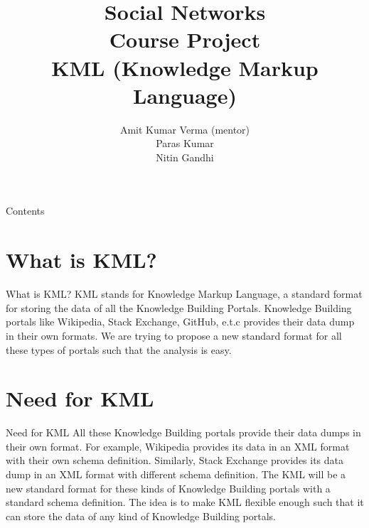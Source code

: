 \documentclass[handout,t]{beamer}
\title[Indian Institute of Technology Ropar]{Social Networks\\Course Project\\KML (Knowledge Markup Language)}
\date{}
\author[KML (Knowledge Markup Language)]{Amit Kumar Verma (mentor)\\ Paras Kumar\\ Nitin Gandhi\\}
\begin{document}

\frame{\titlepage}
\section[]{}
\begin{frame}{Contents}
  \tableofcontents
\end{frame}


\section{What is KML?}
\begin{frame}{What is KML?}
KML stands for Knowledge Markup Language, a standard format for storing the data of all the Knowledge Building Portals. Knowledge Building portals like Wikipedia, Stack Exchange, GitHub, e.t.c provides their data dump in their own formats. We are trying to propose a new standard format for all these types of portals such that the analysis is easy.

\end{frame}

\section{Need for KML}
\begin{frame}{Need for KML}
All these Knowledge Building portals provide their data dumps in their own format. For example, Wikipedia provides its data in an XML format with their own schema definition. Similarly, Stack Exchange provides its data dump in an XML format with different schema definition. The KML will be a new standard format for these kinds of Knowledge Building portals with a standard schema definition. The idea is to make KML flexible enough such that it can store the data of any kind of Knowledge Building portals.\end{frame}
\end{document}
